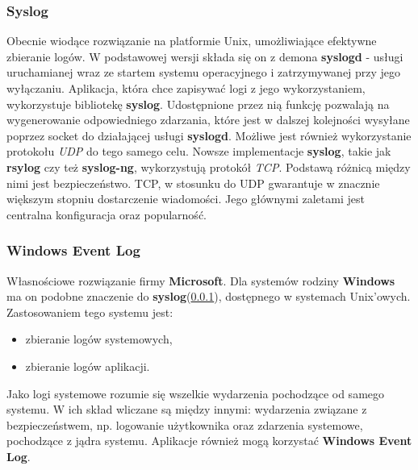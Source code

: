         \subsubsection{Syslog}
        \label{chapter:logs:collecting:source:syslog}
        Obecnie wiodące rozwiązanie na platformie Unix, umożliwiające efektywne zbieranie logów. 
        W podstawowej wersji składa się on z demona \textbf{syslogd} - usługi
        uruchamianej wraz ze startem systemu operacyjnego i zatrzymywanej przy jego wyłączaniu. 
        Aplikacja, która chce zapisywać logi z jego wykorzystaniem, wykorzystuje bibliotekę \textbf{syslog}.
        Udostępnione przez nią funkcję pozwalają na wygenerowanie odpowiedniego zdarzania, które jest
        w dalszej kolejności wysyłane poprzez socket do działającej usługi \textbf{syslogd}. Możliwe jest
        również wykorzystanie protokołu \textit{UDP} do tego samego celu.
        Nowsze implementacje \textbf{syslog}, takie jak \textbf{rsylog} czy też \textbf{syslog-ng}, 
        wykorzystują protokół \textit{TCP}. Podstawą różnicą między nimi jest bezpieczeństwo. TCP, w stosunku do UDP \cite{logging_log_management}
        gwarantuje w znacznie większym stopniu dostarczenie wiadomości.
        Jego głównymi zaletami jest centralna konfiguracja oraz popularność.
        
        \subsubsection{Windows Event Log}
        \label{chapter:logs:collecting:source:windows_event_log}
        Własnościowe rozwiązanie firmy \textbf{Microsoft}. Dla systemów rodziny \textbf{Windows}
        ma on podobne znaczenie do \textbf{syslog}(\ref{chapter:logs:collecting:source:syslog}),
        dostępnego w systemach Unix'owych. Zastosowaniem tego systemu jest:
        \begin{itemize}
            \item zbieranie logów systemowych,
            \item zbieranie logów aplikacji.
        \end{itemize}
        Jako logi systemowe rozumie się wszelkie wydarzenia pochodzące od samego systemu. W ich skład
        wliczane są między innymi: wydarzenia związane z bezpieczeństwem, np. 
        logowanie użytkownika oraz zdarzenia systemowe, pochodzące z jądra systemu. Aplikacje
        również mogą korzystać \textbf{Windows Event Log}.
        
